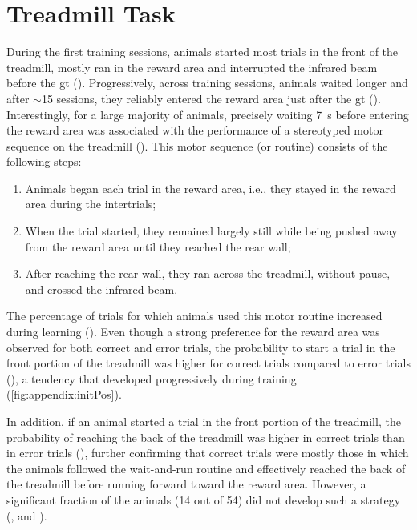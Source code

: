 \section{Treadmill Task}
\label{ch:time:treadmill}
During the first training sessions, animals started most trials in the front of the treadmill, mostly ran in the reward area and interrupted the infrared beam before the \gls{gt} ().
Progressively, across training sessions, animals waited longer and after $\sim$15 sessions, they reliably entered the reward area just after the \gls{gt} ().
Interestingly, for a large majority of animals, precisely waiting 7~s before entering the reward area was associated with the performance of a stereotyped motor sequence on the treadmill ().
This motor sequence (or routine) consists of the following steps:
\begin{enumerate}[noitemsep, label=\Roman*.]
    \item Animals began each trial in the reward area, i.e., they stayed in the reward area during the intertrials;
    \item When the trial started, they remained largely still while being pushed away from the reward area until they reached the rear wall;
    \item After reaching the rear wall, they ran across the treadmill, without pause, and crossed the infrared beam.
\end{enumerate}

The percentage of trials for which animals used this motor routine increased during learning ().
Even though a strong preference for the reward area was observed for both correct and error trials, the probability to start a trial in the front portion of the treadmill was higher for correct trials compared to error trials (), a tendency that developed progressively during training (\autoref{fig:appendix:initPos}).
\par
In addition, if an animal started a trial in the front portion of the treadmill, the probability of reaching the back of the treadmill was higher in correct trials than in error trials (), further confirming that correct trials were mostly those in which the animals followed the wait-and-run routine and effectively reached the back of the treadmill before running forward toward the reward area.
However, a significant fraction of the animals (14 out of 54) did not develop such a strategy (, and ).

